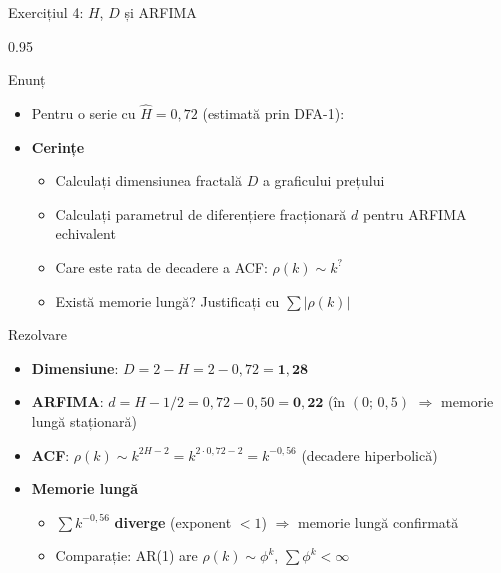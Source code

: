 \documentclass[9pt, aspectratio=169, t]{beamer}
\begin{document}
\begin{frame}[shrink=15]{Exercițiul 4: $H$, $D$ și ARFIMA}
\begin{cminipage}{0.95\textwidth}
\begin{block}{Enunț}
\begin{itemize}\setlength{\itemsep}{0pt}
    \item Pentru o serie cu $\hat H=0{,}72$ (estimată prin DFA-1):
\end{itemize}
\end{block}
\begin{itemize}\setlength{\itemsep}{0pt}
    \item \textbf{Cerințe}
    \begin{itemize}\setlength{\itemsep}{0pt}
        \item Calculați dimensiunea fractală $D$ a graficului prețului
        \item Calculați parametrul de diferențiere fracționară $d$ pentru ARFIMA echivalent
        \item Care este rata de decadere a ACF: $\rho(k)\sim k^{?}$
        \item Există memorie lungă? Justificați cu $\sum|\rho(k)|$
    \end{itemize}
\end{itemize}
\begin{exampleblock}{Rezolvare}
\begin{itemize}\setlength{\itemsep}{0pt}
    \item \textbf{Dimensiune}: $D=2-H=2-0{,}72=\mathbf{1{,}28}$
    \item \textbf{ARFIMA}: $d=H-1/2=0{,}72-0{,}50=\mathbf{0{,}22}$ (în $(0;\,0{,}5)$ $\Rightarrow$ memorie lungă staționară)
    \item \textbf{ACF}: $\rho(k)\sim k^{2H-2}=k^{2\cdot 0{,}72-2}=k^{-0{,}56}$ (decadere hiperbolică)
    \item \textbf{Memorie lungă}
    \begin{itemize}\setlength{\itemsep}{0pt}
        \item $\sum k^{-0{,}56}$ \textbf{diverge} (exponent $<1$) $\Rightarrow$ memorie lungă confirmată
        \item Comparație: AR(1) are $\rho(k)\sim\phi^k$, $\sum\phi^k<\infty$
    \end{itemize}
\end{itemize}
\end{exampleblock}
\end{cminipage}
\end{frame}
\end{document}
